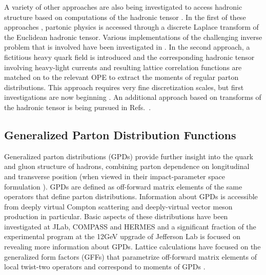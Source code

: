 A variety of other approaches are also being investigated to access hadronic structure based on computations of the hadronic tensor \cite{Liu:1993cv,Aglietti:1998mz,Detmold:2005gg,Liu:2016djw}. In the first of these approaches \cite{Liu:1993cv,Liu:2016djw}, partonic physics is accessed through a discrete Laplace transform of the Euclidean hadronic tensor. Various implementations of the challenging inverse problem that is involved have been investigated in \cite{Liang:2017mye}. In the second approach, a fictitious heavy quark field is introduced and the corresponding hadronic tensor involving heavy-light currents and resulting lattice correlation functions are matched on to the relevant OPE to extract the moments of regular parton distributions. This approach requires very fine discretization scales, but first investigations are now beginning \cite{Detmold:2018kwu}. 
An additional approach based on transforms of the hadronic tensor is being pursued in Refs.~\cite{Chambers:2017dov}.

\subsection{Generalized Parton Distribution Functions}

%	

Generalized parton distributions (GPDs) \cite{Ji:2001wha,Radyushkin:1997ki,Diehl:2003ny,Belitsky:2005qn} provide further insight into the quark and gluon structure of hadrons, combining parton dependence on longitudinal and transverse position (when viewed in their impact-parameter space formulation \cite{Burkardt:2000za}). GPDs are defined as  off-forward matrix elements of the same operators that define parton distributions.   Information about GPDs is accessible from deeply virtual Compton scattering and deeply-virtual vector meson production in particular. Basic aspects of these distributions have been investigated at JLab, COMPASS and HERMES and a significant fraction of the experimental program at the 12GeV upgrade of Jefferson Lab is focused on revealing more  information about  GPDs. Lattice calculations have focused on the generalized form factors (GFFs) that parametrize off-forward matrix elements of local twist-two operators and correspond to moments of GPDs \cite{Hagler:2003jd,Hagler:2007xi,Hagler:2009mb}. 

